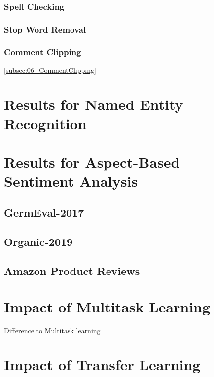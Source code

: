 \subsubsection{Spell Checking}

\subsubsection{Stop Word Removal}

\subsubsection{Comment Clipping}
\ref{subsec:06_CommentClipping}


\section{Results for Named Entity Recognition}

\section{Results for Aspect-Based Sentiment Analysis}

\subsection{GermEval-2017}
\label{sec:06_ResultsGermEval}

\subsection{Organic-2019}

\subsection{Amazon Product Reviews}

\section{Impact of Multitask Learning}
Difference to Multitask learning



\section{Impact of Transfer Learning}

